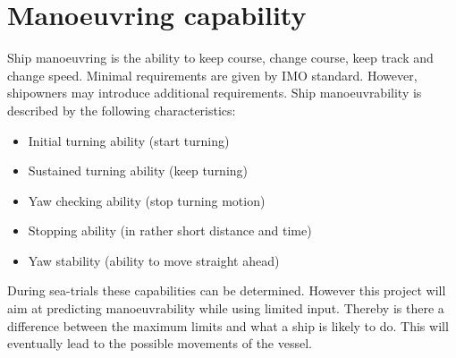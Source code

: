 \chapter{Manoeuvring capability}
Ship manoeuvring is the ability to keep course, change course, keep track and change speed. Minimal requirements are given by \ac{IMO} standard. However, shipowners may introduce additional requirements. 
Ship manoeuvrability is described by the following characteristics: 
\begin{itemize}
	\item Initial turning ability (start turning)
	\item Sustained turning ability (keep turning)
	\item Yaw checking ability (stop turning motion)
	\item Stopping ability (in rather short distance and time)
	\item Yaw stability (ability to move straight ahead)
\end{itemize}
During sea-trials these capabilities can be determined. However this project will aim at predicting manoeuvrability while using limited input. Thereby is there a difference between the maximum limits and what a ship is likely to do. This will eventually lead to the possible movements of the vessel.

